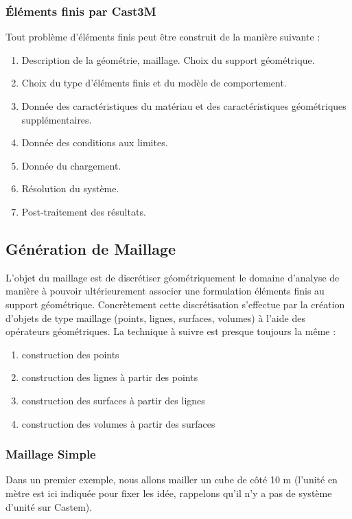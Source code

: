\documentclass[a4paper,multicol]{article}
\begin{document}
\subsubsection*{Éléments finis par Cast3M}
Tout problème d'éléments finis peut être construit de la manière suivante :
\begin{enumerate}
\item   Description de la géométrie, maillage. Choix du support géométrique.
\item   Choix du type d'éléments finis et du modèle de comportement.
\item   Donnée des caractéristiques du matériau et des caractéristiques géométriques supplémentaires.
\item   Donnée des conditions aux limites.
\item   Donnée du chargement.
\item   Résolution du système.
\item   Post-traitement des résultats.
\end{enumerate}


\subsection*{Génération de Maillage}
L'objet du maillage est de discrétiser géométriquement le domaine d'analyse de manière
à pouvoir ultérieurement associer une formulation éléments finis au support géométrique.
Concrètement cette discrétisation s'effectue par la création d'objets de type maillage (points,
lignes, surfaces, volumes) à l'aide des opérateurs géométriques. La technique à suivre est
presque toujours la même :
\begin{enumerate}
\item  construction des points
\item   construction des lignes à partir des points
\item   construction des surfaces à partir des lignes
\item   construction des volumes à partir des surfaces
\end{enumerate}
\subsubsection*{Maillage Simple}
Dans un premier exemple, nous allons mailler un cube de côté 10 m (l'unité en mètre est
ici indiquée pour fixer les idée, rappelons qu'il n'y a pas de système d'unité sur Castem).
\end{document}
